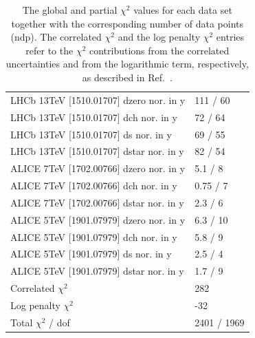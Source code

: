 \documentclass[12pt]{article}
\begin{document}
\begin{table}
\begin{tabular}{ll}
    LHCb 13TeV [1510.01707] dzero nor. in y & 111 / 60  \\ 
    LHCb 13TeV [1510.01707] dch nor. in y & 72 / 64  \\ 
    LHCb 13TeV [1510.01707] ds nor. in y & 69 / 55  \\ 
    LHCb 13TeV [1510.01707] dstar nor. in y & 82 / 54  \\ 
    ALICE 7TeV [1702.00766] dzero nor. in y & 5.1 / 8  \\ 
    ALICE 7TeV [1702.00766] dch nor. in y & 0.75 / 7  \\ 
    ALICE 7TeV [1702.00766] dstar nor. in y & 2.3 / 6  \\ 
    ALICE 5TeV [1901.07979] dzero nor. in y & 6.3 / 10  \\ 
    ALICE 5TeV [1901.07979] dch nor. in y & 5.8 / 9  \\ 
    ALICE 5TeV [1901.07979] ds nor. in y & 2.5 / 4  \\ 
    ALICE 5TeV [1901.07979] dstar nor. in y & 1.7 / 9  \\ 
    \hline
    Correlated $\chi^2$  & 282  \\ 
    Log penalty $\chi^2$  &  -32  \\ 
    \hline
    Total $\chi^2$ / dof  & 2401 / 1969  \\ 
\end{tabular}
\caption{The global and partial $\chi^2$ values for each data set together with the corresponding number of data points (ndp). The correlated $\chi^2$ and the log penalty $\chi^2$ entries refer to the $\chi^2$ contributions from the correlated uncertainties and from the logarithmic term, respectively, as described in Ref.~\cite{Abramowicz:2015mha}.}
\label{tab:chi}
\end{table}
\end{document}
